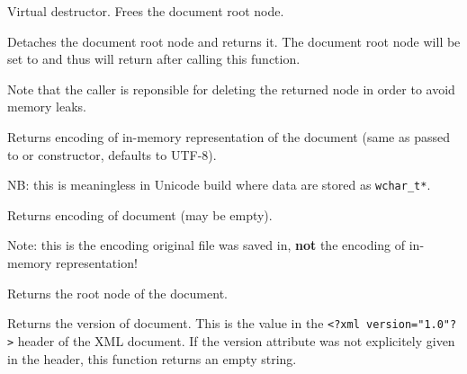 \label{wxxmldocumentdtor}


Virtual destructor. Frees the document root node.



\label{wxxmldocumentdetachroot}


Detaches the document root node and returns it. The document root node will be set to \NULL
and thus  will return \false after calling this function.

Note that the caller is reponsible for deleting the returned node in order to avoid memory leaks.



\label{wxxmldocumentgetencoding}


Returns encoding of in-memory representation of the document
(same as passed to  or constructor, defaults to UTF-8).

NB: this is meaningless in Unicode build where data are stored as {\tt wchar\_t*}.



\label{wxxmldocumentgetfileencoding}


Returns encoding of document (may be empty).

Note: this is the encoding original file was saved in, {\bf not} the
encoding of in-memory representation!



\label{wxxmldocumentgetroot}


Returns the root node of the document.



\label{wxxmldocumentgetversion}


Returns the version of document.
This is the value in the {\tt <?xml version="1.0"?>} header of the XML document.
If the version attribute was not explicitely given in the header, this function
returns an empty string.



